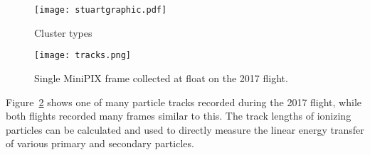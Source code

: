 %
%
\begin{figure}[H]
\centering
\texttt{[image: stuartgraphic.pdf]}
\caption{Cluster types\cite{stuartalgo}} %
\label{fig:stuartfigure}
\end{figure}
%
%
\begin{figure}[H]
\centering
\texttt{[image: tracks.png]} %
\caption{Single MiniPIX frame collected at float on the 2017 flight.}
\label{fig:frame1}
\end{figure}
Figure~\ref{fig:frame1} shows one of many particle tracks recorded during the 2017 flight, while both flights recorded many frames similar to this.  The track lengths of ionizing particles can be calculated and used to directly measure the linear energy transfer of various primary and secondary particles.



